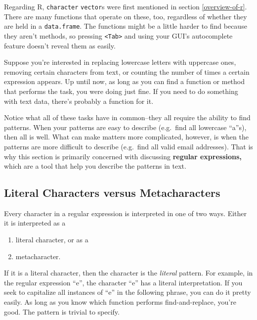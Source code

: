\documentclass[
  12pt,
  krantz2]{krantz}
\providecommand{\tightlist}{%
  \setlength{\itemsep}{0pt}\setlength{\parskip}{0pt}}
\begin{document}
Regarding R, \texttt{character} \texttt{vector}s were first mentioned in section \ref{overview-of-r}. There are many functions that operate on these, too, regardless of whether they are held in a \texttt{data.frame}. The functions might be a little harder to find because they aren't methods, so pressing \texttt{\textless{}Tab\textgreater{}} and using your GUI's autocomplete feature doesn't reveal them as easily.

Suppose you're interested in replacing lowercase letters with uppercase ones, removing certain characters from text, or counting the number of times a certain expression appears. Up until now, as long as you can find a function or method that performs the task, you were doing just fine. If you need to do something with text data, there's probably a function for it.

Notice what all of these tasks have in common--they all require the ability to find patterns. When your patterns are easy to describe (e.g.~find all lowercase ``a''s), then all is well. What can make matters more complicated, however, is when the patterns are more difficult to describe (e.g.~find all valid email addresses). That is why this section is primarily concerned with discussing \textbf{regular expressions,} which are a tool that help you describe the patterns in text.

\hypertarget{literal-characters-versus-metacharacters}{%
\subsection{Literal Characters versus Metacharacters}\label{literal-characters-versus-metacharacters}}

Every character in a regular expression is interpreted in one of two ways. Either it is interpreted as a

\begin{enumerate}
\def\labelenumi{\arabic{enumi}.}
\tightlist
\item
  literal character, or as a
\item
  metacharacter.
\end{enumerate}

If it is a literal character, then the character is the \emph{literal} pattern. For example, in the regular expression ``e'', the character ``e'' has a literal interpretation. If you seek to capitalize all instances of ``e'' in the following phrase, you can do it pretty easily. As long as you know which function performs find-and-replace, you're good. The pattern is trivial to specify.
\end{document}
